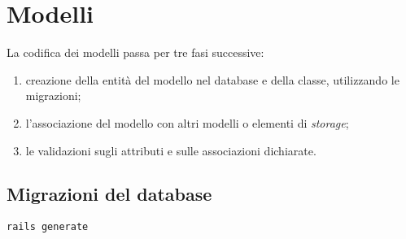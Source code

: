 \section{Modelli}
La codifica dei modelli passa per tre fasi successive:
\begin{enumerate}
	\item creazione della entità del modello nel database e della classe, utilizzando le migrazioni;
	\item l'associazione del modello con altri modelli o elementi di \emph{storage};
	\item le validazioni sugli attributi e sulle associazioni dichiarate.
\end{enumerate}

\subsection{Migrazioni del database}
 \texttt{rails generate} 


